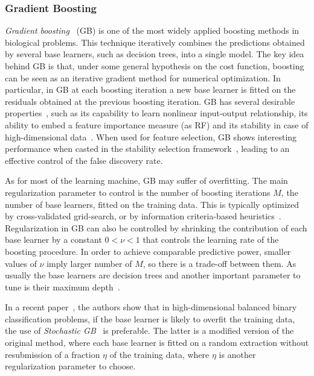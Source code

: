	    \subsubsection{Gradient Boosting} \label{sec:gradient_boosting}
	    
	    \textit{Gradient boosting}~\cite{friedman2001greedy} (\ac{GB}) is one of the most widely applied boosting methods in biological problems.
	    This technique iteratively combines the predictions obtained by several base learners, such as decision trees, into a single model.
	    The key idea behind GB is that, under some general hypothesis on the cost function, boosting can be seen as an iterative gradient method for numerical optimization.
	    In particular, in GB at each boosting iteration a new base learner is fitted on the residuals obtained at the previous boosting iteration.
	    GB has several desirable properties~\cite{mayr2014evolution}, such as its capability to learn nonlinear input-output relationship, its ability to embed a feature importance measure (as RF) and its stability in case of high-dimensional data~\cite{buehlmann2006boosting}. When used for feature selection, GB shows interesting performance when casted in the stability selection framework~\cite{meinshausen2010stability}, leading to an effective control of the false discovery rate.

	    As for most of the learning machine, GB may suffer of overfitting. The main regularization parameter to control is the number of boosting iterations $M$, \ie the number of base learners, fitted on the training data. This is typically optimized by cross-validated grid-search, or by information criteria-based heuristics~\cite{tutz2006generalized, tutz2007boosting}.
	    Regularization in GB can also be controlled by shrinking the contribution of each base learner by a constant $0<\nu<1$ that controls the learning rate of the boosting procedure. In order to achieve comparable predictive power, smaller values of $\nu$ imply larger number of $M$, so there is a trade-off between them.
	    As usually the base learners are decision trees and another important parameter to tune is their maximum depth~\cite{hastie2009elements}.

	    In a recent paper~\cite{lusa2015boosting}, the authors show that in high-dimensional balanced binary classification problems, if the base learner is likely to overfit the training data, the use of \textit{Stochastic GB}~\cite{friedman2002stochastic} is preferable. The latter is a modified version of the original method, where each base learner is fitted on a random extraction without resubmission of a fraction $\eta$ of the training data, where $\eta$ is another regularization parameter to choose.
	    
